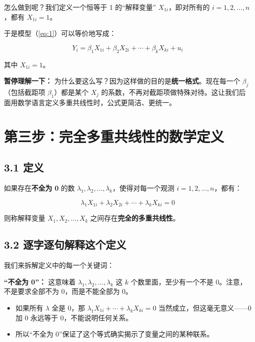 \documentclass[12pt,a4paper]{ctexart}
\begin{document}
怎么做到呢？我们定义一个恒等于 1 的“解释变量” $X_{1i}$，即对所有的 $i=1,2,\ldots,n$，都有 $X_{1i}=1$。

于是模型（\ref{eq:1}）可以等价地写成：

\begin{equation}
Y_i = \beta_1 X_{1i} + \beta_2 X_{2i} + \cdots + \beta_k X_{ki} + u_i \label{eq:2}
\end{equation}

其中 $X_{1i}=1$。

\textbf{暂停理解一下：} 为什么要这么写？因为这样做的目的是\textbf{统一格式}。现在每一个 $\beta_j$（包括截距项 $\beta_1$）都是某个 $X_j$ 的系数，不再对截距项做特殊对待。这让我们后面用数学语言定义多重共线性时，公式更简洁、更统一。

\section*{第三步：完全多重共线性的数学定义}

\subsection*{3.1 定义}

如果存在\textbf{不全为 0} 的数 $\lambda_1, \lambda_2, \ldots, \lambda_k$，使得对每一个观测 $i=1,2,\ldots,n$，都有：

\begin{equation}
\lambda_1 X_{1i} + \lambda_2 X_{2i} + \cdots + \lambda_k X_{ki} = 0 \label{eq:3}
\end{equation}

则称解释变量 $X_1, X_2, \ldots, X_k$ 之间存在\textbf{完全的多重共线性}。

\subsection*{3.2 逐字逐句解释这个定义}

我们来拆解定义中的每一个关键词：

\textbf{“不全为 0”：} 这意味着 $\lambda_1, \lambda_2, \ldots, \lambda_k$ 这 $k$ 个数里面，至少有一个不是 0。注意，不是要求全部不为 0，而是不能全部为 0。

\begin{itemize}
    \item 如果所有 $\lambda$ 全是 0，那 $\lambda_1 X_{1i} + \cdots + \lambda_k X_{ki} = 0$ 当然成立，但这毫无意义——0 加 0 永远等于 0，不能说明任何关系。
    \item 所以“不全为 0”保证了这个等式确实揭示了变量之间的某种联系。
\end{itemize}
\end{document}
